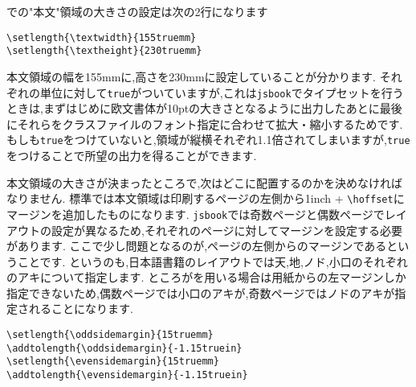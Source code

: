 での"本文"領域の大きさの設定は次の2行になります
\begin{verbatim}
\setlength{\textwidth}{155truemm}
\setlength{\textheight}{230truemm}
\end{verbatim}
本文領域の幅を155mmに,高さを230mmに設定していることが分かります.
それぞれの単位に対して\texttt{true}がついていますが,これは\texttt{jsbook}でタイプセットを行うときは,まずはじめに欧文書体が10ptの大きさとなるように出力したあとに最後にそれらをクラスファイルのフォント指定に合わせて拡大・縮小するためです.
もしも\texttt{true}をつけていないと,領域が縦横それぞれ1.1倍されてしまいますが,\texttt{true}をつけることで所望の出力を得ることができます.

本文領域の大きさが決まったところで,次はどこに配置するのかを決めなければなりません.
標準では本文領域は印刷するページの左側から1inch + \verb|\|\texttt{hoffset}にマージンを追加したものになります.
\texttt{jsbook}では奇数ページと偶数ページでレイアウトの設定が異なるため,それぞれのページに対してマージンを設定する必要があります.
ここで少し問題となるのが,ページの左側からのマージンであるということです.
というのも,日本語書籍のレイアウトでは天,地,ノド,小口のそれぞれのアキについて指定します.
ところが{\pLaTeX}を用いる場合は用紙からの左マージンしか指定できないため,偶数ページでは小口のアキが,奇数ページではノドのアキが指定されることになります.
\begin{verbatim}
\setlength{\oddsidemargin}{15truemm}
\addtolength{\oddsidemargin}{-1.15truein}
\setlength{\evensidemargin}{15truemm}
\addtolength{\evensidemargin}{-1.15truein}
\end{verbatim}
